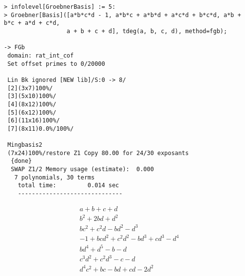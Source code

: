 \begin{Verbatim}[fontsize=\footnotesize]
> infolevel[GroebnerBasis] := 5:
> Groebner[Basis]([a*b*c*d - 1, a*b*c + a*b*d + a*c*d + b*c*d, a*b + b*c + a*d + c*d,
                  a + b + c + d], tdeg(a, b, c, d), method=fgb);

-> FGb
 domain: rat_int_cof
 Set offset primes to 0/20000

 Lin Bk ignored [NEW lib]/S:0 -> 8/
 [2](3x7)100%/
 [3](5x10)100%/
 [4](8x12)100%/
 [5](6x12)100%/
 [6](11x16)100%/
 [7](8x11)0.0%/100%/

 Mingbasis2
 (7x24)100%/restore Z1 Copy 80.00 for 24/30 exposants
  {done}
  SWAP Z1/2 Memory usage (estimate):  0.000
   7 polynomials, 30 terms
    total time:         0.014 sec
    ------------------------------
\end{Verbatim}
\begin{eqnarray*}
	&  a+b+c+d\\
	&  b^2+2bd+d^2\\
	&  bc^2+c^2d-bd^2-d^3\\
	&  -1+bcd^2+c^2d^2-bd^3+cd^3-d^4\\
	&  bd^4+d^5-b-d\\
	&  c^3d^2+c^2d^3-c-d\\
	&  d^4c^2+bc-bd+cd-2d^2
\end{eqnarray*}

